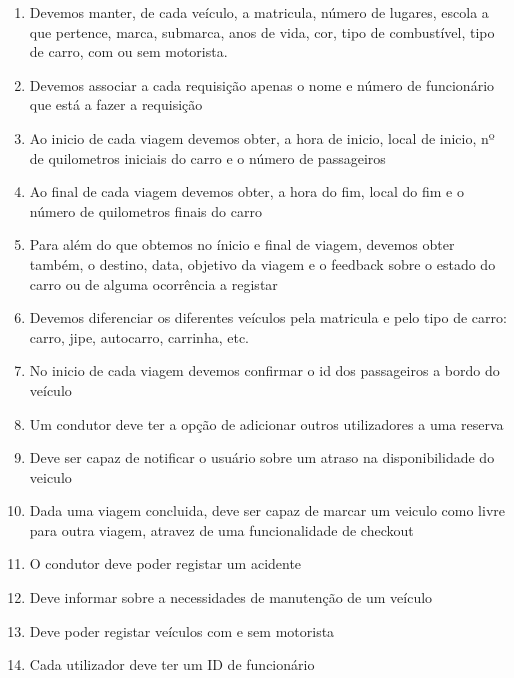 \documentclass[11pt,a4paper]{report}%
\begin{document}
\begin{enumerate}

\item Devemos manter, de cada veículo, a matricula, número de lugares, escola a que pertence, marca, submarca, anos de vida, cor, tipo de combustível, tipo de carro, com ou sem motorista.

\item Devemos associar a cada requisição apenas o nome e número de funcionário que está a fazer a requisição

\item Ao inicio de cada viagem devemos obter, a hora de inicio, local de inicio, nº de quilometros iniciais do carro e o número de passageiros

\item Ao final de cada viagem devemos obter, a hora do fim, local do fim e o número de quilometros finais do carro

\item Para além do que obtemos no ínicio e final de viagem, devemos obter também, o destino, data, objetivo da viagem e o feedback sobre o estado do carro ou de alguma ocorrência a registar

\item Devemos diferenciar os diferentes veículos pela matricula e pelo tipo de carro: carro, jipe, autocarro, carrinha, etc.

\item No inicio de cada viagem devemos confirmar o id dos passageiros a bordo do veículo

\item Um condutor deve ter a opção de adicionar outros utilizadores a uma reserva

\item Deve ser capaz de notificar o usuário sobre um atraso na disponibilidade do veiculo

\item Dada uma viagem concluida, deve ser capaz de marcar um veiculo como livre para outra viagem, atravez de uma funcionalidade de checkout

\item O condutor deve poder registar um acidente

\item Deve informar sobre a necessidades de manutenção de um veículo

\item Deve poder registar veículos com e sem motorista

\item Cada utilizador deve ter um ID de funcionário


\end{enumerate}
\end{document}
